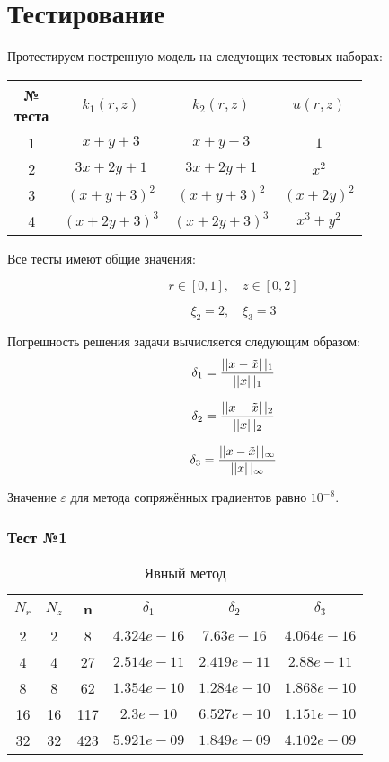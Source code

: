 \section{Тестирование}

Протестируем постренную модель на следующих тестовых наборах:

\begin{center}
  \begin{tabular}{*4{c}}
  \toprule
  \makecell{№ \\ теста} & $k_1(r, z)$ & $k_2(r, z)$ & $ u(r, z)$ \\
  \midrule
  1 & $ x + y + 3 $ & $ x + y + 3 $ & $1$ \\
  2 & $ 3x + 2y + 1 $ & $ 3x + 2y + 1 $ & $x^2$ \\
  3 & $ (x + y + 3)^2 $ & $ (x + y + 3)^2 $ & $(x + 2y)^2$ \\
  4 & $ (x + 2y + 3)^3 $ & $ (x + 2y + 3)^3 $ & $x^3 + y^2$ \\
  \bottomrule
  \end{tabular}
\end{center}

Все тесты имеют общие значения:

\[
  r \in [0, 1],\quad z \in [0, 2]
\]

\[
  \xi_2 = 2,\quad \xi_3 = 3
\]

Погрешность решения задачи вычисляется следующим образом:
\[
\delta_1 = \frac{\left|| x - \Tilde{x} \right||_1 }{\left|| x \right||_1 }
\]

\[
\delta_2 = \frac{\left|| x - \Tilde{x} \right||_2 }{\left|| x \right||_2 }
\]

\[
\delta_3 = \frac{\left|| x - \Tilde{x} \right||_\infty }{\left|| x \right||_\infty }
\]

Значение $ \varepsilon $ для метода сопряжённых градиентов равно $ 10^{-8} $.

\subsubsection*{Тест №1}

\begin{table}[H]
\begin{center}
  \begin{tabular}{*{6}c}
    \toprule
    $ N_r $ & $ N_z $ & n & $ \delta_1 $ & $ \delta_2 $ & $ \delta_3 $ \\
    \midrule
    2 & 2 & 8 & $4.324e-16 $ & $7.63e-16 $ & $4.064e-16 $ \\
    4 & 4 & 27 & $2.514e-11 $ & $2.419e-11 $ & $2.88e-11 $ \\
    8 & 8 & 62 & $1.354e-10 $ & $1.284e-10 $ & $1.868e-10 $ \\
    16 & 16 & 117 & $2.3e-10 $ & $6.527e-10 $ & $1.151e-10 $ \\
    32 & 32 & 423 & $5.921e-09 $ & $1.849e-09 $ & $4.102e-09 $ \\
    \bottomrule
  \end{tabular}
  \caption{Явный метод}
\end{center}
\end{table}

